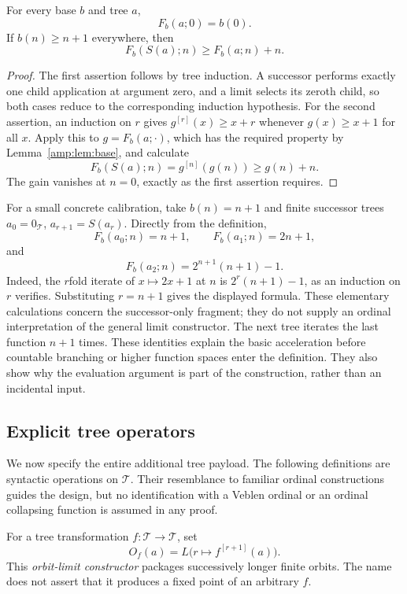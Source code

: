 \begin{proposition}
\label{amp:prop:gain}
For every base $b$ and tree $a$,
\[
 F_b(a;0)=b(0).
\]
If $b(n)\geq n+1$ everywhere, then
\[
 F_b(S(a);n)\geq F_b(a;n)+n.
\]
\end{proposition}

\begin{proof}
The first assertion follows by tree induction.  A successor performs exactly
one child application at argument zero, and a limit selects its zeroth
child, so both cases reduce to the corresponding induction hypothesis.
For the second assertion, an induction on $r$ gives
$g^{[r]}(x)\geq x+r$ whenever $g(x)\geq x+1$ for all $x$.
Apply this to $g=F_b(a;\mathord\cdot)$, which has the required property by
Lemma~\ref{amp:lem:base}, and calculate
\[
 F_b(S(a);n)=g^{[n]}(g(n))\geq g(n)+n.
\]
The gain vanishes at $n=0$, exactly as the first assertion requires.
\end{proof}

For a small concrete calibration, take $b(n)=n+1$ and finite successor trees
$a_0=0_{\mathcal T}$, $a_{r+1}=S(a_r)$.  Directly from the definition,
\[
 F_b(a_0;n)=n+1,\qquad F_b(a_1;n)=2n+1,
\]
and
\[
 F_b(a_2;n)=2^{n+1}(n+1)-1.
\]
Indeed, the $r$fold iterate of $x\mapsto2x+1$ at $n$ is
$2^r(n+1)-1$, as an induction on $r$ verifies.  Substituting $r=n+1$ gives
the displayed formula.  These elementary calculations concern the
successor-only fragment; they do not supply an ordinal interpretation of
the general limit constructor.
The next tree iterates the last function $n+1$ times.  These identities
explain the basic acceleration before countable branching or higher
function spaces enter the definition.  They also show why the evaluation
argument is part of the construction, rather than an incidental input.

\subsection{Explicit tree operators}
\label{amp:operators}

We now specify the entire additional tree payload.  The following definitions
are syntactic operations on $\mathcal T$.  Their resemblance to familiar
ordinal constructions guides the design, but no identification with a
Veblen ordinal or an ordinal collapsing function is assumed in any proof.

For a tree transformation $f:\mathcal T\to\mathcal T$, set
\[
 O_f(a)=L\bigl(r\mapsto f^{[r+1]}(a)\bigr).
\]
This \emph{orbit-limit constructor} packages successively longer finite
orbits.  The name does not assert that it produces a fixed point of an
arbitrary $f$.

